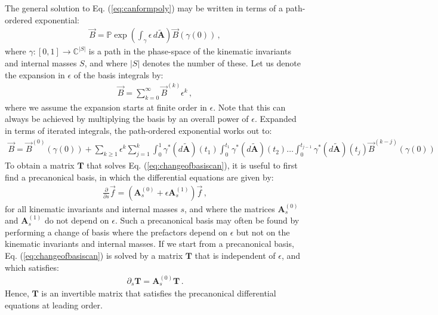 \documentclass{article}
\begin{document}
The general solution to Eq. (\ref{eq:canformpoly}) may be written in terms of a path-ordered exponential:
\begin{align}
    \vec{B}=\mathbb{P} \exp \left( \int_{\gamma}  \epsilon\, d\tilde{\mathbf{A}} \right) \vec{B}(\gamma(0))\,,
\end{align}
where $\gamma: [0,1] \rightarrow \mathbb{C}^{|S|}$ is a path in the phase-space of the kinematic invariants and internal masses $S$, and where $|S|$ denotes the number of these. Let us denote the expansion in $\epsilon$ of the basis integrals by:
\begin{align}
    \vec{B} = \sum_{k=0}^\infty \vec{B}^{(k)} \epsilon^k\,,
\end{align}
where we assume the expansion starts at finite order in $\epsilon$. Note that this can always be achieved by multiplying the basis by an overall power of $\epsilon$. Expanded in terms of iterated integrals, the path-ordered exponential works out to:
\begin{align}
\vec{B}=\vec{B}^{(0)}(\gamma(0))+\sum_{k \geq 1} \epsilon^{k} \sum_{j=1}^{k} \int_{0}^{1} \gamma^{*}(d \tilde{\mathbf{A}})\left(t_{1}\right) \int_{0}^{t_{1}} \gamma^{*}(d \tilde{\mathbf{A}})\left(t_{2}\right) \ldots \int_{0}^{t_{j-1}} \gamma^{*}(d \tilde{\mathbf{A}})\left(t_{j}\right) \vec{B}^{(k-j)}(\gamma(0))
\end{align}
To obtain a matrix $\mathbf{T}$ that solves Eq. (\ref{eq:changeofbasiscan}), it is useful to first find a precanonical basis, in which the differential equations are given by:
\begin{align}
    \frac{\partial}{\partial s} \vec{f} = \left(\mathbf{A}_s^{(0)} + \epsilon \mathbf{A}_s^{(1)}\right) \vec{f}\,,
\end{align}
for all kinematic invariants and internal masses $s$, and where the matrices $\mathbf{A}_s^{(0)}$ and $\mathbf{A}_s^{(1)}$ do not depend on $\epsilon$. Such a precanonical basis may often be found by performing a change of basis where the prefactors depend on $\epsilon$ but not on the kinematic invariants and internal masses. If we start from a precanonical basis, Eq. (\ref{eq:changeofbasiscan}) is solved by a matrix $\mathbf{T}$ that is independent of $\epsilon$, and which satisfies:
\begin{align}
    \partial_{s}\mathbf{T} = \mathbf{A}_{s}^{(0)}\mathbf{T}\,.
\end{align}
Hence, $\mathbf{T}$ is an invertible matrix that satisfies the precanonical differential equations at leading order.
\end{document}
